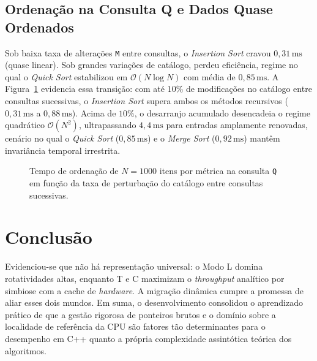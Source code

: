 \documentclass[letterpaper]{article}
\begin{document}
\subsection{Ordenação na Consulta Q e Dados Quase Ordenados}
Sob baixa taxa de alterações \texttt{M} entre consultas, o \textit{Insertion Sort} cravou $0{,}31\,\text{ms}$ (quase linear). Sob grandes variações de catálogo, perdeu eficiência, regime no qual o \textit{Quick Sort} estabilizou em $\mathcal{O}(N \log N)$ com média de $0{,}85\,\text{ms}$. A Figura~\ref{fig:ordenacao} evidencia essa transição: com até $10\%$ de modificações no catálogo entre consultas sucessivas, o \textit{Insertion Sort} supera ambos os métodos recursivos ($0{,}31\,\text{ms}$ a $0{,}88\,\text{ms}$). Acima de $10\%$, o desarranjo acumulado desencadeia o regime quadrático $\mathcal{O}(N^2)$, ultrapassando $4{,}4\,\text{ms}$ para entradas amplamente renovadas, cenário no qual o \textit{Quick Sort} ($0{,}85\,\text{ms}$) e o \textit{Merge Sort} ($0{,}92\,\text{ms}$) mantêm invariância temporal irrestrita.

\begin{figure}[t]
\centering
{}
\caption{Tempo de ordenação de $N=1000$ itens por métrica na consulta \texttt{Q} em função da taxa de perturbação do catálogo entre consultas sucessivas.}
\label{fig:ordenacao}
\end{figure}

\section{Conclusão}
Evidenciou-se que não há representação universal: o Modo L domina rotatividades altas, enquanto T e C maximizam o \textit{throughput} analítico por simbiose com a cache de \textit{hardware}. A migração dinâmica cumpre a promessa de aliar esses dois mundos. Em suma, o desenvolvimento consolidou o aprendizado prático de que a gestão rigorosa de ponteiros brutos e o domínio sobre a localidade de referência da CPU são fatores tão determinantes para o desempenho em C++ quanto a própria complexidade assintótica teórica dos algoritmos.
\end{document}
